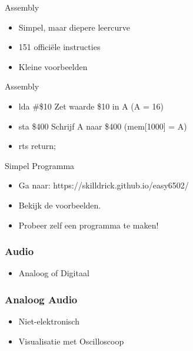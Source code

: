 \documentclass[aspectratio=43]{uva-inf-presentation}
\begin{document}
\begin{frame}{Assembly}

\begin{itemize}
\item Simpel, maar diepere leercurve
\item 151 offici\"ele instructies
\item Kleine voorbeelden
\end{itemize}

\end{frame}


\begin{frame}{Assembly}

\begin{itemize}
\item lda \#\$10 Zet waarde \$10 in A (A = 16)
\item sta \$400 Schrijf A naar \$400 (mem[1000] = A)
\item rts return;
\end{itemize}

\end{frame}


\begin{frame}{Simpel Programma}

\begin{itemize}
\item Ga naar: https://skilldrick.github.io/easy6502/
\item Bekijk de voorbeelden.
\item Probeer zelf een programma te maken!
\end{itemize}


\end{frame}


\begin{frame}
\frametitle{Audio}

\begin{itemize}
\item Analoog of Digitaal
\end{itemize}

\end{frame}


\begin{frame}
\frametitle{Analoog Audio}

\begin{itemize}
\item Niet-elektronisch
\item Visualisatie met Oscilloscoop
\end{itemize}

\end{frame}
\end{document}
